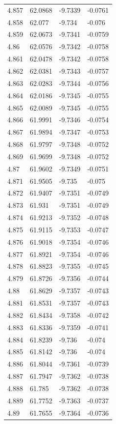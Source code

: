 \begin{tabular}{llll}
4.857 & 62.0868 & -9.7339 & -0.0761 \\
4.858 & 62.077 & -9.734 & -0.076 \\
4.859 & 62.0673 & -9.7341 & -0.0759 \\
4.86 & 62.0576 & -9.7342 & -0.0758 \\
4.861 & 62.0478 & -9.7342 & -0.0758 \\
4.862 & 62.0381 & -9.7343 & -0.0757 \\
4.863 & 62.0283 & -9.7344 & -0.0756 \\
4.864 & 62.0186 & -9.7345 & -0.0755 \\
4.865 & 62.0089 & -9.7345 & -0.0755 \\
4.866 & 61.9991 & -9.7346 & -0.0754 \\
4.867 & 61.9894 & -9.7347 & -0.0753 \\
4.868 & 61.9797 & -9.7348 & -0.0752 \\
4.869 & 61.9699 & -9.7348 & -0.0752 \\
4.87 & 61.9602 & -9.7349 & -0.0751 \\
4.871 & 61.9505 & -9.735 & -0.075 \\
4.872 & 61.9407 & -9.7351 & -0.0749 \\
4.873 & 61.931 & -9.7351 & -0.0749 \\
4.874 & 61.9213 & -9.7352 & -0.0748 \\
4.875 & 61.9115 & -9.7353 & -0.0747 \\
4.876 & 61.9018 & -9.7354 & -0.0746 \\
4.877 & 61.8921 & -9.7354 & -0.0746 \\
4.878 & 61.8823 & -9.7355 & -0.0745 \\
4.879 & 61.8726 & -9.7356 & -0.0744 \\
4.88 & 61.8629 & -9.7357 & -0.0743 \\
4.881 & 61.8531 & -9.7357 & -0.0743 \\
4.882 & 61.8434 & -9.7358 & -0.0742 \\
4.883 & 61.8336 & -9.7359 & -0.0741 \\
4.884 & 61.8239 & -9.736 & -0.074 \\
4.885 & 61.8142 & -9.736 & -0.074 \\
4.886 & 61.8044 & -9.7361 & -0.0739 \\
4.887 & 61.7947 & -9.7362 & -0.0738 \\
4.888 & 61.785 & -9.7362 & -0.0738 \\
4.889 & 61.7752 & -9.7363 & -0.0737 \\
4.89 & 61.7655 & -9.7364 & -0.0736 \\

\end{tabular}
